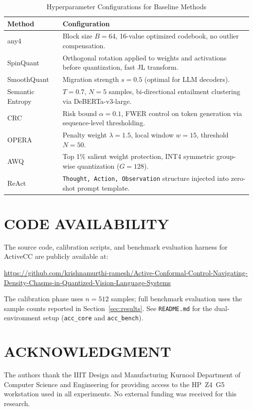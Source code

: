 \documentclass{ieeetmlcn}
\begin{document}
\begin{table}[htbp]
\caption{Hyperparameter Configurations for Baseline Methods}
\label{tab:baseline_params}
\centering
\begin{tabular}{lp{4.8cm}}
\toprule
\textbf{Method} & \textbf{Configuration} \\
\midrule
any4 \cite{elhoushi2025any} & Block size $B=64$, 16-value optimized codebook, no outlier compensation. \\
SpinQuant \cite{liu2025spinquant} & Orthogonal rotation applied to weights and activations before quantization, fast JL transform. \\
SmoothQuant \cite{xiao2023smoothquant} & Migration strength $s=0.5$ (optimal for LLM decoders). \\
Semantic Entropy \cite{kuhn2023semantic} & $T=0.7$, $N=5$ samples, bi-directional entailment clustering via DeBERTa-v3-large. \\
CRC \cite{angelopoulos2024conformal} & Risk bound $\alpha=0.1$, FWER control on token generation via sequence-level thresholding. \\
OPERA \cite{huang2023opera} & Penalty weight $\lambda=1.5$, local window $w=15$, threshold $N=50$. \\
AWQ \cite{lin2024awq} & Top 1\% salient weight protection, INT4 symmetric group-wise quantization ($G=128$). \\
ReAct \cite{yao2022react} & \texttt{Thought, Action, Observation} structure injected into zero-shot prompt template. \\
\bottomrule
\end{tabular}
\end{table}

\section*{CODE AVAILABILITY}
The source code, calibration scripts, and benchmark evaluation harness for ActiveCC are publicly available at:
\begin{center}
\url{https://github.com/krishnamurthi-ramesh/Active-Conformal-Control-Navigating-Density-Chasms-in-Quantized-Vision-Language-Systems}
\end{center}
The calibration phase uses $n=512$ samples; full benchmark evaluation uses the sample counts reported in Section~\ref{sec:results}. See \texttt{README.md} for the dual-environment setup (\texttt{acc\_core} and \texttt{acc\_bench}).

\section*{ACKNOWLEDGMENT}
The authors thank the IIIT Design and Manufacturing Kurnool Department of Computer Science and Engineering for providing access to the HP~Z4~G5 workstation used in all experiments. No external funding was received for this research.
\end{document}
